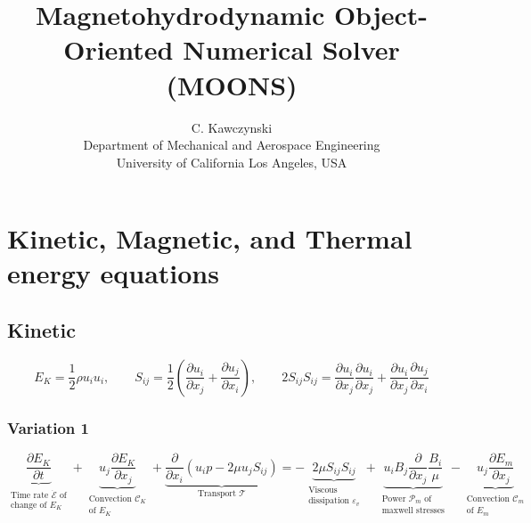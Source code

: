 \documentclass[11pt]{article}
\newcommand{\MC}{\mathcal}
\newcommand{\PD}{\partial}
\begin{document}
\doublespacing
\title{Magnetohydrodynamic Object-Oriented Numerical Solver (MOONS)}
\author{C. Kawczynski \\
Department of Mechanical and Aerospace Engineering \\
University of California Los Angeles, USA\\
}
\maketitle

\section{Kinetic, Magnetic, and Thermal energy equations}

\subsection{Kinetic}
\begin{equation}
	E_K = \frac{1}{2} \rho u_i u_i
	,\qquad
	S_{ij} = \frac{1}{2} \left( \frac{\PD u_i}{\PD x_j} + \frac{\PD u_j}{\PD x_i} \right)
	,\qquad
	2S_{ij}S_{ij} = \frac{\PD u_i}{\PD x_j} \frac{\PD u_i}{\PD x_j}
	+ \frac{\PD u_i}{\PD x_j} \frac{\PD u_j}{\PD x_i}
\end{equation}
\subsubsection{Variation 1}
\begin{equation}
	\boxed{
	\underbrace{\frac{\PD E_K}{\PD t}}_{\substack{\text{Time rate $\dot{\MC E}$ of} \\ \text{change of $E_K$}}} +
	\underbrace{u_j \frac{\PD E_K}{\PD x_j}}_
	{\substack{\text{Convection } \MC C_K \\\text{of $E_K$}}}
	+
	\underbrace{\frac{\PD}{\PD x_i} \left( u_i p - 2 \mu u_j S_{ij} \right)}_{\text{Transport } \MC T} =
	- \underbrace{2 \mu S_{ij} S_{ij}}_{\substack{\text{Viscous } \\ \text{dissipation } \varepsilon_v}}
	+ \underbrace{u_i B_j \frac{\PD}{\PD x_j} \frac{B_i}{\mu}}_
	{\substack{\text{Power $\MC P_{m}$ of}\\\text{maxwell stresses}}}
	- \underbrace{u_j \frac{\PD E_m}{\PD x_j}}_
	{\substack{\text{Convection $\MC C_m$}\\\text{of $E_m$}}}
	}
\end{equation}
\end{document}
